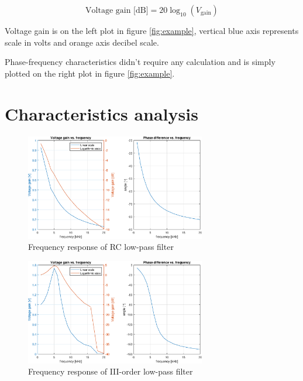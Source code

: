 \documentclass[notitlepage, a4paper, 11pt]{article}
\begin{document}
	\begin{equation}
		\text{Voltage gain [dB]} = 20 \log_{10}(V_{\text{gain}})
	\end{equation}
	
	Voltage gain is on the left plot in figure \ref{fig:example}, vertical blue axis represents scale in volts and orange axis decibel scale.
	
	Phase-frequency characteristics didn't require any calculation and is simply plotted on the right plot in figure \ref{fig:example}.
	
	\section{Characteristics analysis}
	\begin{figure}[H]
		\centering
		\includegraphics[width=0.7\textwidth]{../Matlab/img/11.eps}
		\caption{Frequency response of RC low-pass filter}
	\end{figure}
	\begin{figure}[H]
		\centering
		\includegraphics[width=0.7\textwidth]{../Matlab/img/12.eps}
		\caption{Frequency response of III-order low-pass filter}
	\end{figure}
\end{document}
